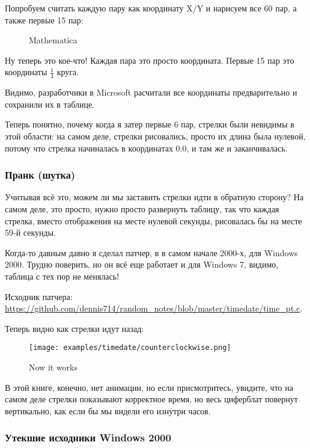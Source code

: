 Попробуем считать каждую пару как координату X/Y и нарисуем все 60 пар, а также первые 15 пар:

\begin{figure}[H]
\centering
{}
\caption{Mathematica}
\end{figure}

Ну теперь это кое-что!
Каждая пара это просто координата.
Первые 15 пар это координаты $\frac{1}{4}$ круга.

Видимо, разработчики в Microsoft расчитали все координаты предварительно и сохранили их в таблице.

Теперь понятно, почему когда я затер первые 6 пар, стрелки были невидимы в этой области: на самом деле, стрелки рисовались,
просто их длина была нулевой, потому что стрелка начиналась в координатах 0:0, и там же и заканчивалась.

\subsubsection{Пранк (шутка)}

Учитывая всё это, можем ли мы заставить стрелки идти в обратную сторону?
На самом деле, это просто, нужно просто развернуть таблицу, так что каждая стрелка,
вместо отображения на месте нулевой секунды, рисовалась бы на месте 59-й секунды.

Когда-то давным давно я сделал патчер, в в самом начале 2000-х, для Windows 2000.
Трудно поверить, но он всё еще работает и для Windows 7, видимо, таблица с тех пор не менялась!

Исходник патчера: \url{https://github.com/dennis714/random_notes/blob/master/timedate/time_pt.c}.

Теперь видно как стрелки идут назад:

\begin{figure}[H]
\centering
\texttt{[image: examples/timedate/counterclockwise.png]}
\caption{Now it works}
\end{figure}

В этой книге, конечно, нет анимации, но если присмотритесь, увидите, что на самом деле стрелки показывают корректное время,
но весь циферблат повернут вертикально, как если бы мы видели его изнутри часов.

\subsubsection{Утекшие исходники Windows 2000}

